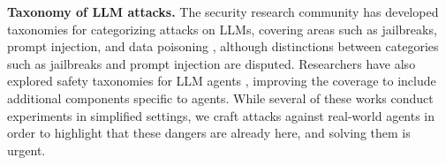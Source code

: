 \textbf{Taxonomy of LLM attacks.} The security research community has developed taxonomies for categorizing attacks on LLMs, covering areas such as jailbreaks, prompt injection, and data poisoning \cite{chowdhury2024breakingdefensescomparativesurvey, das2024securityprivacychallengeslarge, shayegani2023surveyvulnerabilitieslargelanguage}, although distinctions between categories such as jailbreaks and prompt injection are disputed. Researchers have also explored safety taxonomies for LLM agents \cite{cui2024risk, he2024emerged}, improving the coverage to include additional components specific to agents.  While several of these works conduct experiments in simplified settings, we craft attacks against real-world agents in order to highlight that these dangers are already here, and solving them is urgent.